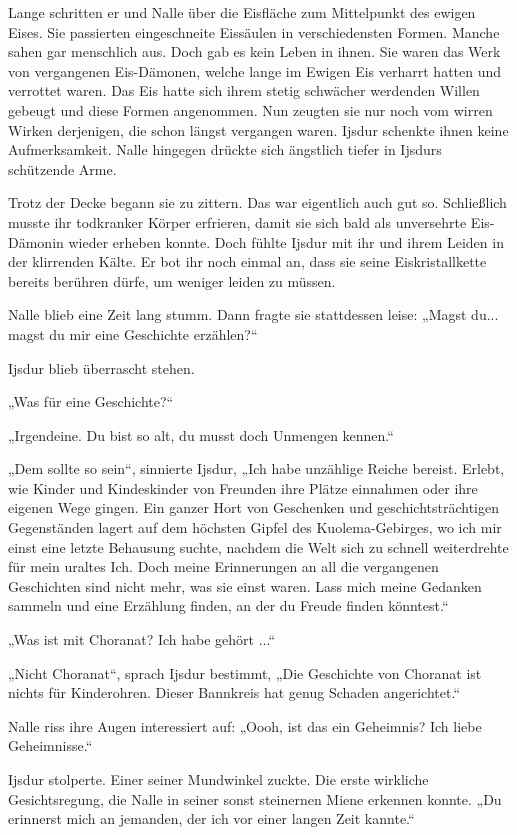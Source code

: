 Lange schritten er und Nalle über die Eisfläche zum Mittelpunkt des ewigen Eises. Sie passierten eingeschneite Eissäulen in verschiedensten Formen. Manche sahen gar menschlich aus. Doch gab es kein Leben in ihnen. Sie waren das Werk von vergangenen Eis-Dämonen, welche lange im Ewigen Eis verharrt hatten und verrottet waren. Das Eis hatte sich ihrem stetig schwächer werdenden Willen gebeugt und diese Formen angenommen. Nun zeugten sie nur noch vom wirren Wirken derjenigen, die schon längst vergangen waren. Ijsdur schenkte ihnen keine Aufmerksamkeit. Nalle hingegen drückte sich ängstlich tiefer in Ijsdurs schützende Arme.

Trotz der Decke begann sie zu zittern. Das war eigentlich auch gut so. Schließlich musste ihr todkranker Körper erfrieren, damit sie sich bald als unversehrte Eis-Dämonin wieder erheben konnte. Doch fühlte Ijsdur mit ihr und ihrem Leiden in der klirrenden Kälte. Er bot ihr noch einmal an, dass sie seine Eiskristallkette bereits berühren dürfe, um weniger leiden zu müssen.

Nalle blieb eine Zeit lang stumm. Dann fragte sie stattdessen leise: „Magst du... magst du mir eine Geschichte erzählen?“

Ijsdur blieb überrascht stehen.

„Was für eine Geschichte?“

„Irgendeine. Du bist so alt, du musst doch Unmengen kennen.“

„Dem sollte so sein“, sinnierte Ijsdur, „Ich habe unzählige Reiche bereist. Erlebt, wie Kinder und Kindeskinder von Freunden ihre Plätze einnahmen oder ihre eigenen Wege gingen. Ein ganzer Hort von Geschenken und geschichtsträchtigen Gegenständen lagert auf dem höchsten Gipfel des Kuolema-Gebirges, wo ich mir einst eine letzte Behausung suchte, nachdem die Welt sich zu schnell weiterdrehte für mein uraltes Ich. Doch meine Erinnerungen an all die vergangenen Geschichten sind nicht mehr, was sie einst waren. Lass mich meine Gedanken sammeln und eine Erzählung finden, an der du Freude finden könntest.“

„Was ist mit Choranat? Ich habe gehört ...“

„Nicht Choranat“, sprach Ijsdur bestimmt, „Die Geschichte von Choranat ist nichts für Kinderohren. Dieser Bannkreis hat genug Schaden angerichtet.“

Nalle riss ihre Augen interessiert auf: „Oooh, ist das ein Geheimnis? Ich liebe Geheimnisse.“

Ijsdur stolperte. Einer seiner Mundwinkel zuckte. Die erste wirkliche Gesichtsregung, die Nalle in seiner sonst steinernen Miene erkennen konnte. „Du erinnerst mich an jemanden, der ich vor einer langen Zeit kannte.“

